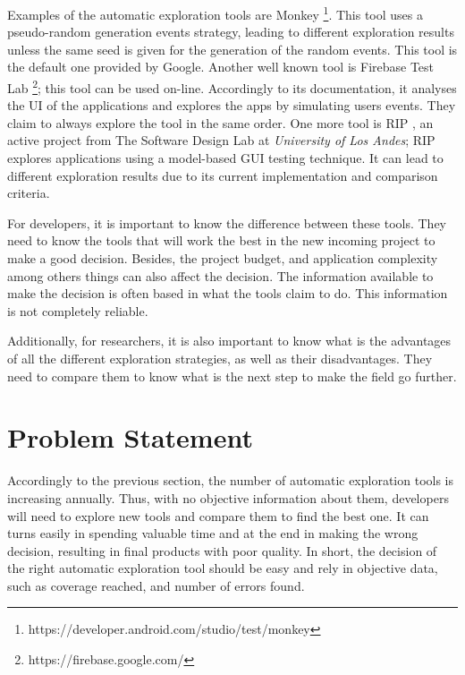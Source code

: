 Examples of the automatic exploration tools are Monkey \footnote{https://developer.android.com/studio/test/monkey}. This tool uses a pseudo-random generation events strategy, leading to different exploration results unless the same seed is given for the generation of the random events. This tool is the default one provided by Google. Another well known tool is Firebase Test Lab \footnote{https://firebase.google.com/}; this tool can be used on-line. Accordingly to its documentation, it analyses the UI of the applications and explores the apps by simulating users events. They claim to always explore the tool in the same order. One more tool is RIP \cite{Liñán}, an active project from  The Software Design Lab at \emph{University of Los Andes}; RIP explores applications using a model-based GUI testing technique. It can lead to different exploration results due to its current implementation and comparison criteria. 

For developers, it is important to know the difference between these tools. They need to know the tools that will work the best in the new incoming project to make a good decision. Besides, the project budget, and application complexity among others things can also affect the decision. The information available to make the decision is often based in what the tools claim to do. This information is not completely reliable.

Additionally, for researchers, it is also important to know what is the advantages of all the different exploration strategies, as well as their disadvantages. They need to compare them to know what is the next step to make the field go further.


\section{Problem Statement}

Accordingly to the previous section, the number of automatic exploration tools is increasing annually. Thus, with no objective information about them, developers  will need to explore new tools and compare them to find the best one. It can turns easily in spending valuable time and at the end in making the wrong decision, resulting in final products with poor quality. In short, the decision of the right automatic exploration tool should be easy and rely in objective data, such as coverage reached, and number of errors found.

